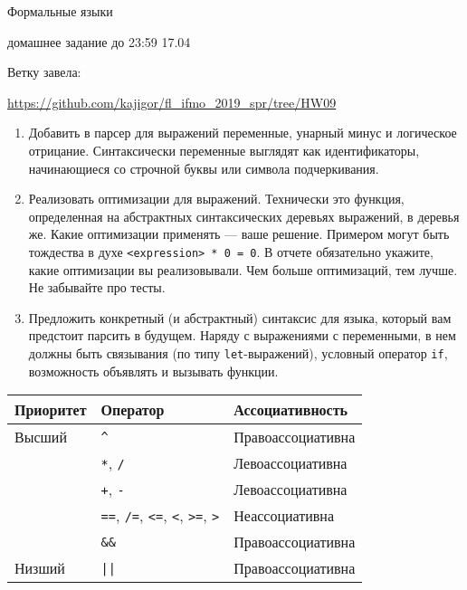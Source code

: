 \documentclass[12pt]{article}
\begin{document}
\begin{center}
\LARGE {Формальные языки}

\Large {домашнее задание до 23:59 17.04}
\end{center} 

\bigskip

Ветку завела: 

\url{https://github.com/kajigor/fl\_ifmo\_2019\_spr/tree/HW09}

\begin{enumerate}
  \item Добавить в парсер для выражений переменные, унарный минус и логическое отрицание. Синтаксически переменные выглядят как идентификаторы, начинающиеся со строчной буквы или символа подчеркивания.
  \item Реализовать оптимизации для выражений. Технически это функция, определенная на абстрактных синтаксических деревьях выражений, в деревья же. Какие оптимизации применять --- ваше решение. Примером могут быть тождества в духе \verb!<expression> * 0 = 0!. В отчете обязательно укажите, какие оптимизации вы реализовывали. Чем больше оптимизаций, тем лучше. Не забывайте про тесты. 
  \item Предложить конкретный (и абстрактный) синтаксис для языка, который вам предстоит парсить в будущем. Наряду с выражениями с переменными, в нем должны быть связывания (по типу \verb!let!-выражений), условный оператор \verb!if!, возможность объявлять и вызывать функции.
\end{enumerate}

\begin{table}[h]
\centering
\begin{tabular}{l|l|l}
Приоритет & Оператор & Ассоциативность \\ \hline
Высший & \verb!^! & Правоассоциативна \\
       & \verb!*!, \verb!/! & Левоассоциативна  \\
       & \verb!+!, \verb!-! & Левоассоциативна  \\
       & \verb!==!, \verb!/=!, \verb!<=!, \verb!<!, \verb!>=!, \verb!>! & Неассоциативна \\
       & \verb!&&! & Правоассоциативна \\
Низший & \verb!||! & Правоассоциативна 
\end{tabular}
\end{table}
\end{document}
